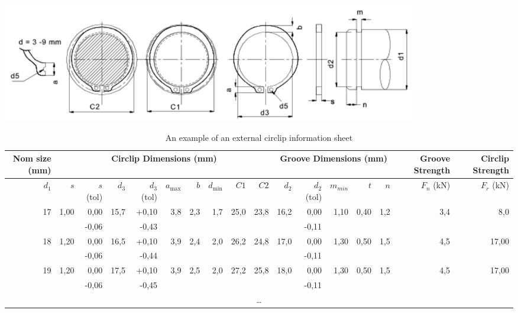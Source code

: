 \begin{table}[h!]
  \caption{An example of an external circlip information sheet}\label{tbl-circlip}
  \centering
  \scriptsize
  \includegraphics[width=0.8\textwidth]{figs/circlip-dimensions.png}
  \begin{tabular}{r r r r r r r r r r r r r r r r r}
  \toprule
  \multicolumn{1}{p{0.05\textwidth}}{Nom size (\si{\milli\metre})} & 
  \multicolumn{9}{c}{Circlip Dimensions (\si{\milli\metre})} &
  \multicolumn{5}{c}{Groove Dimensions (\si{\milli\metre})} & 
  \multicolumn{1}{p{0.05\textwidth}}{Groove Strength} & 
  \multicolumn{1}{p{0.05\textwidth}}{Circlip Strength} \\
  \midrule
  $d_1$ & $s$ & $s$ (tol) & $d_3$ & $d_3$ (tol) & $a_{\max}$ & $b$ & $d_{\min}$ & $C1$ & $C2$ & $d_2$ & $d_2$ (tol) & $m_{min}$ & $t$ & $n$ & $F_n$ (kN) & $F_r$ (kN) \\
  \midrule

  17 & 1,00 & 0,00 & 15,7 & +0,10 & 3,8 & 2,3 & 1,7 & 25,0 & 23,8 & 16,2 & 0,00 & 1,10 & 0,40 & 1,2 & 3,4 & 8,0 \\
  & & -0,06 & & -0,43 & & & & & & & -0,11 & & & & & \\

  18 & 1,20 & 0,00 & 16,5 & +0,10 & 3,9 & 2,4 & 2,0 & 26,2 & 24,8 & 17,0 & 0,00 & 1,30 & 0,50 & 1,5 & 4,5 & 17,00 \\
  & & -0,06 & & -0,44 & & & & & & & -0,11 & & & & & \\

  19 & 1,20 & 0,00 & 17,5 & +0,10 & 3,9 & 2,5 & 2,0 & 27,2 & 25,8 & 18,0 & 0,00 & 1,30 & 0,50 & 1,5 & 4,5 & 17,00 \\
  & & -0,06 & & -0,45 & & & & & & & -0,11 & & & & & \\

  \multicolumn{17}{c}{\ldots} \\

  \bottomrule
  
  \end{tabular}
\end{table}


